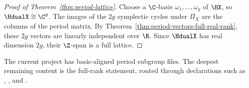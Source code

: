 \begin{proof}[Proof of Theorem~\ref{thm:period-lattice}]\leanok
Choose a \(\C\)-basis \(\omega_1,\dots,\omega_g\) of \(\HX\), so
\(\HdualX\cong\C^g\). The images of the \(2g\) symplectic cycles under
\(\Pi_X\) are the columns of the period matrix.
By Theorem~\ref{thm:period-vectors-full-real-rank}, these \(2g\) vectors
are linearly independent over \(\R\). Since \(\HdualX\) has real
dimension \(2g\), their \(\Z\)-span is a full lattice.
\end{proof}

\begin{formalizationnote}
The current project has basis-aligned period subgroup files. The deepest
remaining content is the full-rank statement, routed through declarations such
as ,
, and
.
\end{formalizationnote}
